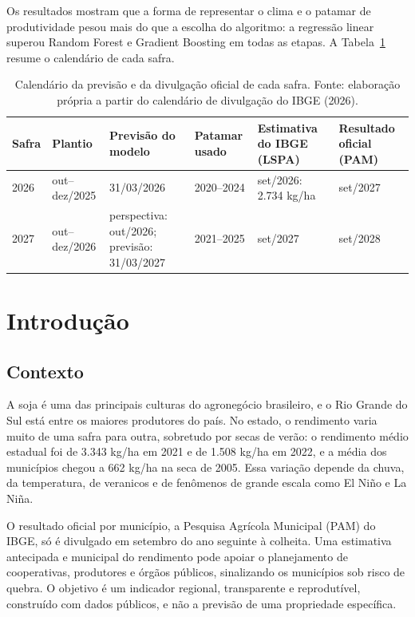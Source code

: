 \documentclass[12pt]{article}
\begin{document}
Os resultados mostram que a forma de representar o clima e o patamar de
produtividade pesou mais do que a escolha do algoritmo: a regressão linear
superou Random Forest e Gradient Boosting em todas as etapas. A
Tabela~\ref{tab:calendario} resume o calendário de cada safra.

\begin{table}[ht]
\centering
\caption{Calendário da previsão e da divulgação oficial de cada safra.
  Fonte: elaboração própria a partir do calendário de divulgação do IBGE
  (2026).}
\label{tab:calendario}
\small
\begin{tabular}{|p{1.1cm}|p{1.9cm}|p{2.6cm}|p{1.9cm}|p{2.6cm}|p{2.3cm}|}
\hline
\textbf{Safra} & \textbf{Plantio} & \textbf{Previsão do modelo} &
  \textbf{Patamar usado} & \textbf{Estimativa do IBGE (LSPA)} &
  \textbf{Resultado oficial (PAM)} \\ \hline
2026 & out--dez/2025 & 31/03/2026 & 2020--2024 & set/2026: 2.734 kg/ha &
  set/2027 \\ \hline
2027 & out--dez/2026 & perspectiva: out/2026; previsão: 31/03/2027 &
  2021--2025 & set/2027 & set/2028 \\ \hline
\end{tabular}
\end{table}

\section{Introdução}

\subsection{Contexto}

A soja é uma das principais culturas do agronegócio brasileiro, e o Rio
Grande do Sul está entre os maiores produtores do país. No estado, o
rendimento varia muito de uma safra para outra, sobretudo por secas de
verão: o rendimento médio estadual foi de 3.343 kg/ha em 2021 e de 1.508
kg/ha em 2022, e a média dos municípios chegou a 662 kg/ha na seca de
2005. Essa variação depende da chuva, da temperatura, de veranicos e de
fenômenos de grande escala como El Niño e La Niña.

O resultado oficial por município, a Pesquisa Agrícola Municipal (PAM) do
IBGE, só é divulgado em setembro do ano seguinte à colheita. Uma
estimativa antecipada e municipal do rendimento pode apoiar o planejamento
de cooperativas, produtores e órgãos públicos, sinalizando os municípios
sob risco de quebra. O objetivo é um indicador regional, transparente e
reprodutível, construído com dados públicos, e não a previsão de uma
propriedade específica.
\end{document}
